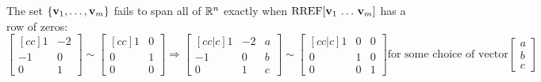 
\begin{applicationActivities}


\begin{fact}
  The set \(\{\mathbf v_1,\dots,\mathbf v_m\}\) fails to span all of \(\mathbb{R}^n\)
  exactly when \(\operatorname{RREF}[\mathbf v_1\,\dots\,\mathbf v_m]\) has a row of zeros:
  \[\begin{bmatrix}[cc]1&-2\\-1&0\\0&1\end{bmatrix}\sim
  \begin{bmatrix}[cc]1&0\\0&1\\0&0\end{bmatrix}\Rightarrow
  \begin{bmatrix}[cc|c]1&-2&a\\-1&0&b\\0&1&c\end{bmatrix}\sim
  \begin{bmatrix}[cc|c]1&0&0\\0&1&0\\0&0&1\end{bmatrix}
  \text{for some choice of vector} \begin{bmatrix} a \\ b \\ c \end{bmatrix} \]
\end{fact}


\end{applicationActivities}

